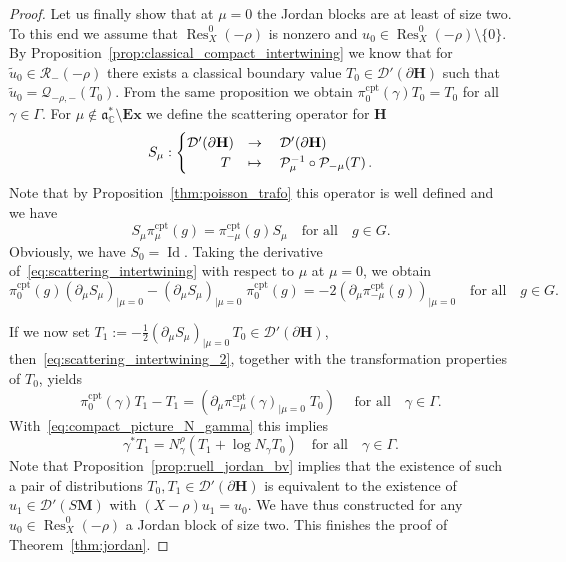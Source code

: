 \documentclass[10pt]{amsart}
\theoremstyle{definition}
\DeclareMathOperator{\Res}{Res}
\DeclareMathOperator{\cpt}{cpt}
\DeclareMathOperator{\Id}{Id}
\newcommand{\mc}{\mathcal}
\newcommand{\cc}{\mathbb{C}}
\newcommand{\bfh}{\mathbf{H}}
\newcommand{\bfm}{\mathbf{M}}
\newcommand{\pl}{\partial}
\newcommand{\til}{\widetilde}
\renewcommand{\a}{\mathfrak a}
\begin{document}
\begin{proof}
Let us finally show that at $\mu=0$ the Jordan blocks are at least of size two. To this end we assume that $\Res_{X}^0(-\rho)$ is nonzero and $u_0\in \Res_{X}^0(-\rho)\setminus\{0\}$. By Proposition~\ref{prop:classical_compact_intertwining} we know that for $\til u_0 \in \mc{R}_-(-\rho)$ there exists a classical boundary value $T_0\in \mathcal D'(\pl {\bfh})$ such that $\til u_0 = \mathcal Q_{-\rho, -} (T_0)$. From the same proposition we obtain $\pi_0^{\cpt}(\gamma) T_0 =T_0$ for all $\gamma\in \Gamma$. For $\mu\notin \a^*_\cc\setminus \mathbf{Ex}$ we define the scattering operator for ${\bfh}$
\begin{equation}\label{eq:scattering_operator}
S_\mu:
\begin{cases}
\mathcal D'(\pl{\bfh}) &\rightarrow\quad\mathcal D'(\pl{\bfh})\\
\mkern 43 mu T & \mapsto\quad\mathcal P_{\mu}^{-1}\circ \mathcal P_{-\mu}(T)\,.
\end{cases}
\end{equation}
Note that by Proposition~\ref{thm:poisson_trafo} this operator is well defined and we have
\begin{equation}\label{eq:scattering_intertwining}
S_\mu\pi_\mu^{\cpt}(g) = \pi_{-\mu}^{\cpt}(g) S_\mu \quad\text{for all}\quad g\in G.
\end{equation}
Obviously, we have $S_0 = \Id$. Taking the derivative of~\eqref{eq:scattering_intertwining} with respect to $\mu$ at $\mu=0$, we obtain
\begin{equation}\label{eq:scattering_intertwining_2}
\pi_0^{\cpt}(g) (\partial_\mu S_\mu)_{|\mu=0} - (\partial_\mu S_\mu)_{|\mu=0}\;\pi_0^{\cpt}(g) = -2\left(\partial_\mu \pi_{-\mu}^{\cpt}(g)\right)_{|\mu=0}\quad\text{for all}\quad g\in G.
\end{equation}

\goodbreak
If we now set $T_1 :=-\tfrac{1}{2}(\partial_\mu S_\mu)_{|\mu=0}\,T_0 \in \mathcal D'(\pl{\bfh})$, then~\eqref{eq:scattering_intertwining_2}, together with the transformation properties of $T_0$, yields
\[
\pi_0^{\cpt}(\gamma)T_1-T_1 = \left(\partial_\mu \pi^{\cpt}_{-\mu}(\gamma)_{|\mu=0}\;T_0\right)\quad\text{ for all}\quad \gamma\in \Gamma.
\]
With~\eqref{eq:compact_picture_N_gamma} this implies
\[
\gamma^* T_1 = N_\gamma^\rho(T_1+\log N_\gamma T_0)\quad \text{for all}\quad\gamma\in \Gamma.
\]
Note that Proposition~\ref{prop:ruell_jordan_bv} implies that the existence of such a pair of distributions $T_0, T_1\in \mathcal D'(\pl{\bfh})$ is equivalent to the existence of $u_1\in \mathcal D'(S{\bfm})$ with $(X -\rho)u_1=u_0$. We have thus constructed for any $u_0\in \Res^0_{X}(-\rho)$ a Jordan block of size two. This finishes the proof of Theorem~\ref{thm:jordan}.
\end{proof}
\end{document}
